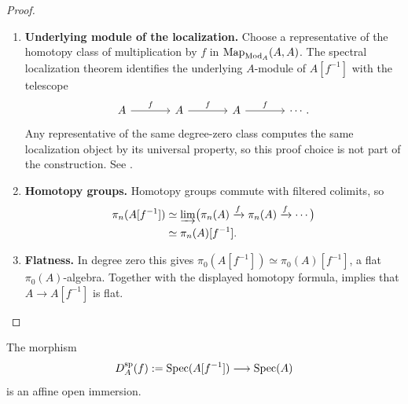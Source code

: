 \begin{proof}
\leavevmode
\begin{enumerate}[label=\textup{(\arabic*)}]
    \item \textbf{Underlying module of the localization.}
    Choose a representative of the homotopy class of multiplication by
    \(f\) in \(\operatorname{Map}_{\operatorname{Mod}_A}(A,A)\). The spectral localization theorem
    identifies the underlying \(A\)-module of \(A[f^{-1}]\) with the
    telescope
    \[
    \begin{tikzcd}[column sep=large]
        A \arrow[r, "f"] & A \arrow[r, "f"] & A \arrow[r, "f"] & \cdots.
    \end{tikzcd}
    \]
    Any representative of the same degree-zero class computes the same
    localization object by its universal property, so this proof choice is not
    part of the construction. See \cite{LurieHigherAlgebra}.

    \item \textbf{Homotopy groups.}
    Homotopy groups commute with filtered colimits, so
    \[
    \begin{aligned}
        \pi_n(A[f^{-1}])
        &\simeq
        \varinjlim
        \bigl(
            \pi_n(A)\xrightarrow{f}\pi_n(A)\xrightarrow{f}\cdots
        \bigr)
        \\
        &\simeq
        \pi_n(A)[f^{-1}].
    \end{aligned}
    \]

    \item \textbf{Flatness.}
    In degree zero this gives
    \(\pi_0(A[f^{-1}])\simeq\pi_0(A)[f^{-1}]\), a flat
    \(\pi_0(A)\)-algebra. Together with the displayed homotopy formula,
     implies that \(A\to A[f^{-1}]\) is flat.
\end{enumerate}
\end{proof}

\begin{proposition}
\label{prop:principal-spectral-open}
The morphism
\[
    D_A^{\mathrm{sp}}(f)
    :=
    \operatorname{Spec}(A[f^{-1}])
    \longrightarrow
    \operatorname{Spec}(A)
\]
is an affine open immersion.
\end{proposition}

